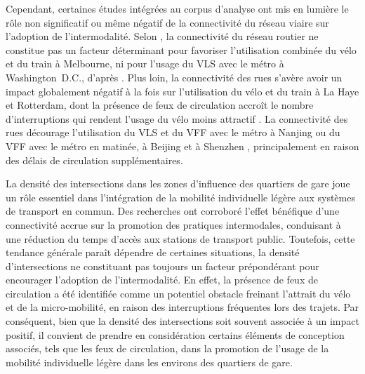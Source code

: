 \begin{refsegment}
Cependant, certaines études intégrées au corpus d'analyse ont mis en lumière le rôle non significatif ou même négatif de la connectivité du réseau viaire sur l'adoption de l'intermodalité. Selon \textcolor{blue}{\textcite[403]{weliwitiya_bicycle_2019}}, la connectivité du réseau routier ne constitue pas un facteur déterminant pour favoriser l'utilisation combinée du vélo et du train à Melbourne, ni pour l'usage du \acrshort{VLS} avec le métro à Washington~D.C., d'après \textcolor{blue}{\textcite[8]{ma_bicycle_2015}}. Plus loin, la connectivité des rues s'avère avoir un impact globalement négatif à la fois sur l'utilisation du vélo et du train à La Haye et Rotterdam, dont la présence de feux de circulation accroît le nombre d'interruptions qui rendent l'usage du vélo moins attractif \textcolor{blue}{\autocite[493]{la_paix_puello_role_2021}}. La connectivité des rues décourage l'utilisation du \acrshort{VLS} et du \acrshort{VFF} avec le métro à Nanjing \textcolor{blue}{\autocite[8]{cheng_comparison_2023}} ou du \acrshort{VFF} avec le métro en matinée, à Beijing \textcolor{blue}{\autocite[16]{ni_exploring_2020}} et à Shenzhen \textcolor{blue}{\autocite[13]{guo_built_2020}}, principalement en raison des délais de circulation supplémentaires.%

La densité des intersections dans les zones d'influence des quartiers de gare joue un rôle essentiel dans l'intégration de la mobilité individuelle légère aux systèmes de transport en commun. Des recherches ont corroboré l'effet bénéfique d'une connectivité accrue sur la promotion des pratiques intermodales, conduisant à une réduction du temps d'accès aux stations de transport public. Toutefois, cette tendance générale paraît dépendre de certaines situations, la densité d'intersections ne constituant pas toujours un facteur prépondérant pour encourager l'adoption de l'intermodalité. En effet, la présence de feux de circulation a été identifiée comme un potentiel obstacle freinant l'attrait du vélo et de la micro-mobilité, en raison des interruptions fréquentes lors des trajets. Par conséquent, bien que la densité des intersections soit souvent associée à un impact positif, il convient de prendre en considération certains éléments de conception associés, tels que les feux de circulation, dans la promotion de l'usage de la mobilité individuelle légère dans les environs des quartiers de gare.%


\end{refsegment}

